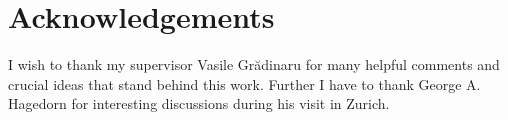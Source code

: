 \chapter{Acknowledgements}
\label{ch:ack}

I wish to thank my supervisor Vasile Gr\u{a}dinaru for many helpful comments
and crucial ideas that stand behind this work. Further I have to thank
George A. Hagedorn for interesting discussions during his visit in Zurich.
